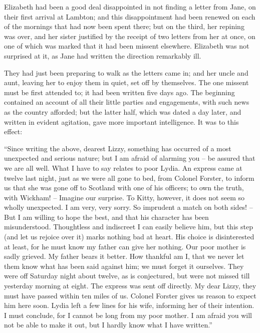 
Elizabeth had been a good deal disappointed in not
finding a letter from Jane, on their first arrival at Lambton;
and this disappointment had been renewed on each of
the mornings that had now been spent there; but on the
third, her repining was over, and her sister justified by
the receipt of two letters from her at once, on one of which
was marked that it had been missent elsewhere. Elizabeth
was not surprised at it, as Jane had written the direction
remarkably ill.

They had just been preparing to walk as the letters
came in; and her uncle and aunt, leaving her to enjoy
them in quiet, set off by themselves. The one missent
must be first attended to; it had been written five days
ago. The beginning contained an account of all their
little parties and engagements, with such news as the
country afforded; but the latter half, which was dated
a day later, and written in evident agitation, gave more
important intelligence. It was to this effect:

“Since writing the above, dearest Lizzy, something has
occurred of a most unexpected and serious nature; but
I am afraid of alarming you -- be assured that we are all
well. What I have to say relates to poor Lydia. An
express came at twelve last night, just as we were all gone
to bed, from Colonel Forster, to inform us that she was
gone off to Scotland with one of his officers; to own the
truth, with Wickham! -- Imagine our surprise. To Kitty,
however, it does not seem so wholly unexpected. I am
very, very sorry. So imprudent a match on both sides! -- But
I am willing to hope the best, and that his character
has been misunderstood. Thoughtless and indiscreet I can
easily believe him, but this step (and let us rejoice over it)
marks nothing bad at heart. His choice is disinterested
at least, for he must know my father can give her nothing.
Our poor mother is sadly grieved. My father bears it
better. How thankful am I, that we never let them know
what has been said against him; we must forget it ourselves.
They were off Saturday night about twelve, as
is conjectured, but were not missed till yesterday morning
at eight. The express was sent off directly. My dear
Lizzy, they must have passed within ten miles of us.
Colonel Forster gives us reason to expect him here
soon. Lydia left a few lines for his wife, informing
her of their intention. I must conclude, for I cannot be
long from my poor mother. I am afraid you will not
be able to make it out, but I hardly know what I have
written.”

